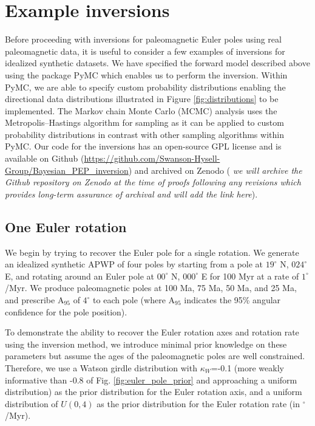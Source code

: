 \documentclass[11pt,letterpaper]{article}
\begin{document}
\section*{Example inversions}
\label{sec:example_inversion}

Before proceeding with inversions for paleomagnetic Euler poles using real paleomagnetic data, it is useful to consider a few examples of inversions for idealized synthetic datasets. We have specified the forward model described above using the package PyMC \citep{Salvatier2016a} which enables us to perform the inversion. Within PyMC, we are able to specify custom probability distributions enabling the directional data distributions illustrated in Figure \ref{fig:distributions} to be implemented. The Markov chain Monte Carlo (MCMC) analysis uses the Metropolis–Hastings algorithm for sampling as it can be applied to custom probability distributions in contrast with other sampling algorithms within PyMC. Our code for the inversions has an open-source GPL license and is available on Github (\url{https://github.com/Swanson-Hysell-Group/Bayesian_PEP_inversion}) and archived on Zenodo ( \textit{we will archive the Github repository on Zenodo at the time of proofs following any revisions which provides long-term assurance of archival and will add the link here}).

\subsection*{One Euler rotation}
\label{sec:one_stage_pole}
We begin by trying to recover the Euler pole for a single rotation. We generate an idealized synthetic APWP of four poles by starting from a pole at $19^\circ$ N, $024^\circ$ E, and rotating around an Euler pole at $00^\circ$ N, $000^\circ$ E for 100 Myr at a rate of $1^\circ$/Myr. We produce paleomagnetic poles at 100 Ma, 75 Ma, 50 Ma, and 25 Ma, and prescribe A$_{95}$ of $4^\circ$ to each pole (where A$_{95}$ indicates the 95\% angular confidence for the pole position).

To demonstrate the ability to recover the Euler rotation axes and rotation rate using the inversion method, we introduce minimal prior knowledge on these parameters but assume the ages of the paleomagnetic poles are well constrained. Therefore, we use a Watson girdle distribution with $\kappa_W$=-0.1 (more weakly informative than -0.8 of Fig. \ref{fig:euler_pole_prior} and approaching a uniform distribution) as the prior distribution for the Euler rotation axis, and a uniform distribution of $U(0, 4)$ as the prior distribution for the Euler rotation rate (in $^\circ$/Myr). 
\end{document}
